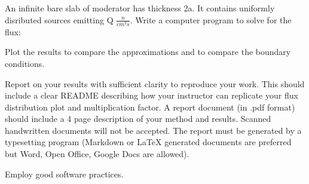 \documentclass[12pts]{exam}
\begin{document}
\begin{questions}
        \question[30] An infinite bare slab of moderator has thickness 2a. It 
        contains uniformly disributed sources emitting Q $\frac{n}{cm^3s}$. 
        Write a computer program to solve for the flux:
        

        Plot the results to compare the approximations and to compare the 
        boundary conditions.

        \question[30] Report on your results with sufficient clarity to reproduce 
        your work. This should include a clear README describing how your 
        instructor can replicate your flux distribution plot and multiplication 
        factor. A report document (in .pdf format) should include a 4 page description of your method and results.
        Scanned handwritten documents will not be accepted. The report must be generated by a typesetting 
        program (Markdown or LaTeX generated documents are preferred but Word, 
        Open Office, Google Docs are allowed).

	\question Employ good software practices.
\end{questions}
\end{document}
